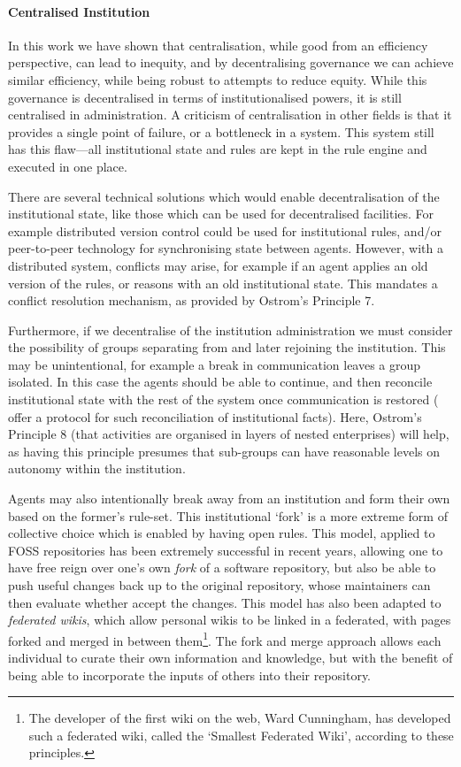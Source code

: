 \paragraph{Centralised Institution} In this work we have shown that
centralisation, while good from an efficiency perspective, can lead to
inequity, and by decentralising governance we can achieve similar efficiency,
while being robust to attempts to reduce equity. While this governance is
decentralised in terms of institutionalised powers, it is still centralised in
administration. A criticism of centralisation in other fields is that it
provides a single point of failure, or a bottleneck in a system. This system
still has this flaw---all institutional state and rules are kept in the rule
engine and executed in one place.

There are several technical solutions which would enable decentralisation of
the institutional state, like those which can be used for decentralised
facilities. For example distributed version control could be used for
institutional rules, and/or peer-to-peer technology for synchronising state
between agents. However, with a distributed system, conflicts may arise, for
example if an agent applies an old version of the rules, or reasons with an
old institutional state. This mandates a conflict resolution mechanism, as
provided by Ostrom's Principle 7.

Furthermore, if we decentralise of the institution administration we must
consider the possibility of groups separating from and later rejoining the
institution. This may be unintentional, for example a break in communication
leaves a group isolated. In this case the agents should be able to continue,
and then reconcile institutional state with the rest of the system once
communication is restored (\citet{Sanderson2012} offer a protocol for such
reconciliation of institutional facts). Here, Ostrom's Principle 8 (that
activities are organised in layers of nested enterprises) will help, as having
this principle presumes that sub-groups can have reasonable levels on autonomy
within the institution.

Agents may also intentionally break away from an institution and form their
own based on the former's rule-set. This institutional `fork' is a more
extreme form of collective choice which is enabled by having open rules. This
model, applied to \ac{FOSS} repositories has been extremely successful in
recent years, allowing one to have free reign over one's own \emph{fork} of a
software repository, but also be able to push useful changes back up to the
original repository, whose maintainers can then evaluate whether accept the
changes. This model has also been adapted to \emph{federated wikis}, which
allow personal wikis to be linked in a federated, with pages forked and merged
in between them\footnote{The developer of the first wiki on the web, Ward
Cunningham, has developed such a federated wiki, called the `Smallest
Federated Wiki', according to these principles.}. The fork and merge approach
allows each individual to curate their own information and knowledge, but with
the benefit of being able to incorporate the inputs of others into their
repository.


